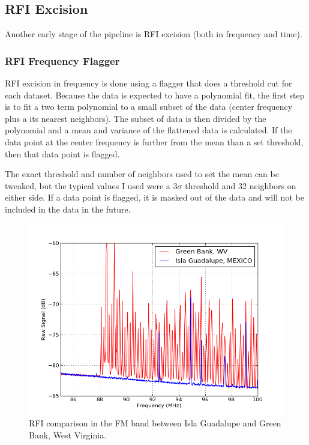 \subsection{RFI Excision}

Another early stage of the pipeline is RFI excision (both in frequency and time). 

\subsubsection{RFI Frequency Flagger}

RFI excision in frequency is done using a flagger that does a threshold cut for each dataset. Because the data is expected to have a polynomial fit, the first step is to fit a two term polynomial to a small subset of the data (center frequency plus a its nearest neighbors). The subset of data is then divided by the polynomial and a mean and variance of the flattened data is calculated. If the data point at the center frequency is further from the mean than a set threshold, then that data point is flagged. 

The exact threshold and number of neighbors used to set the mean can be tweaked, but the typical values I used were a 3$\sigma$ threshold and 32 neighbors on either side. If a data point is flagged, it is masked out of the data and will not be included in the data in the future. 

\begin{figure}[htb]
\begin{center}
\includegraphics[width=0.9\linewidth]{Data_analysis/figures/FM_band_comp.png}
\caption{RFI comparison in the FM band between Isla Guadalupe and Green Bank, West Virginia. }
\label{Fig:FM_band}
\end{center}
\end{figure}

